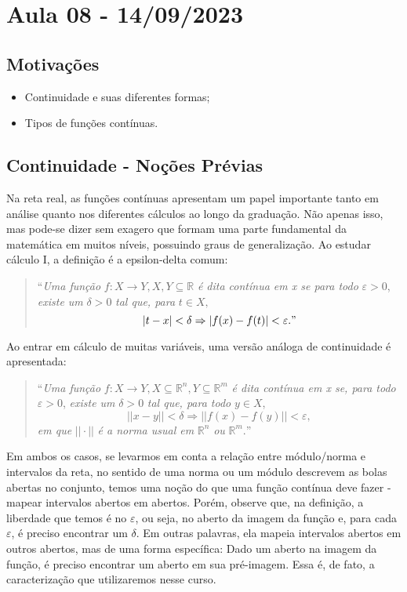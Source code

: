 \documentclass[MetricSpaces/metric_notes.tex]{subfiles}
\begin{document}
\section{Aula 08 - 14/09/2023}
\subsection{Motivações}
\begin{itemize}
	\item Continuidade e suas diferentes formas;
	\item Tipos de funções contínuas.
\end{itemize}
\subsection{Continuidade - Noções Prévias}
Na reta real, as funções contínuas apresentam um papel importante tanto em análise quanto nos diferentes cálculos ao longo da graduação. Não apenas isso, mas
pode-se dizer sem exagero que formam uma parte fundamental da matemática em muitos níveis, possuindo graus de generalização. Ao estudar cálculo I, a definição é
a epsilon-delta comum:
\begin{quote}
	``\textit{Uma função} \(f:X\rightarrow Y, X, Y\subseteq{\mathbb{R}}\) \textit{é dita contínua em x se para todo} \(\varepsilon >0\), \textit{existe um} \(\delta >0\) \textit{tal que, para }\(t\in X,\)
	\[
		|t-x| < \delta \Rightarrow |f(x)-f(t)| < \varepsilon."
	\]
\end{quote}

Ao entrar em cálculo de muitas variáveis, uma versão análoga de continuidade é apresentada:

\begin{quote}
	``\textit{Uma função} \(f:X\rightarrow Y, X\subseteq{\mathbb{R}^{n}}, Y\subseteq{\mathbb{R}^{m}}\) \textit{é dita contínua em x se, para todo} \(\varepsilon >0\), \textit{existe um }\(\delta >0\)
	\textit{tal que, para todo} \(y\in X\),
	\[
		||x-y|| < \delta \Rightarrow ||f(x)-f(y)|| < \varepsilon,
	\]
	\textit{em que} \(||\cdot ||\) \textit{é a norma usual em} \(\mathbb{R}^{n}\) \textit{ou }\(\mathbb{R}^{m}.\)''
\end{quote}
Em ambos os casos, se levarmos em conta a relação entre módulo/norma e intervalos da reta, no sentido de uma norma ou um módulo descrevem as bolas abertas no conjunto, temos uma noção
do que uma função contínua deve fazer - mapear intervalos abertos em abertos. Porém, observe que, na definição, a liberdade que temos é no \(\varepsilon \), ou seja, no aberto da imagem da função
e, para cada \(\varepsilon \), é preciso encontrar um \(\delta \). Em outras palavras, ela mapeia intervalos abertos em outros abertos, mas de uma forma específica: Dado um aberto na imagem da função,
é preciso encontrar um aberto em sua pré-imagem. Essa é, de fato, a caracterização que utilizaremos nesse curso.
\end{document}
